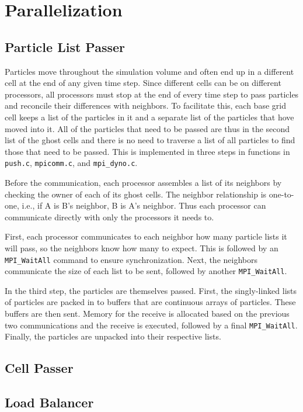 \documentclass[]{article}
\begin{document}
\section{Parallelization}

\subsection{Particle List Passer}
Particles move throughout the simulation volume and often end up in a different cell at the end of any given time step.  Since different cells can be on different processors, all processors must stop at the end of every time step to pass particles and reconcile their differences with neighbors.  To facilitate this, each base grid cell keeps a list of the particles in it and a separate list of the particles that hove moved into it.  All of the particles that need to be passed are thus in the second list of the ghost cells and there is no need to traverse a list of all particles to find those that need to be passed.  This is implemented in three steps in functions in \texttt{push.c}, \texttt{mpicomm.c}, and \texttt{mpi\_dyno.c}.

Before the communication, each processor assembles a list of its neighbors by checking the owner of each of its ghost cells.  The neighbor relationship is one-to-one, i.e., if A is B's neighbor, B is A's neighbor.  Thus each processor can communicate directly with only the processors it needs to.

First, each processor communicates to each neighbor how many particle lists it will pass, so the neighbors know how many to expect.  This is followed by an \texttt{MPI\_WaitAll} command to ensure synchronization.  Next, the neighbors communicate the size of each list to be sent, followed by another \texttt{MPI\_WaitAll}.

In the third step, the particles are themselves passed.  First, the singly-linked lists of particles are packed in to buffers that are continuous arrays of particles.  These buffers are then sent.  Memory for the receive is allocated based on the previous two communications and the receive is executed, followed by a final \texttt{MPI\_WaitAll}.  Finally, the particles are unpacked into their respective lists.

\subsection{Cell Passer}

\subsection{Load Balancer}
\end{document}
